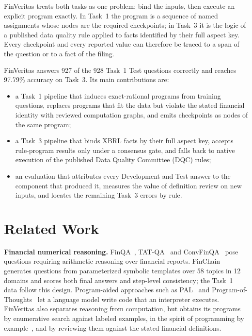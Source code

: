 \documentclass[conference]{IEEEtran}
\begin{document}
FinVeritas treats both tasks as one problem: bind the inputs, then execute an explicit program exactly. In Task~1 the program is a sequence of named assignments whose nodes are the required checkpoints; in Task~3 it is the logic of a published data quality rule applied to facts identified by their full aspect key. Every checkpoint and every reported value can therefore be traced to a span of the question or to a fact of the filing.

FinVeritas answers 927 of the 928 Task~1 Test questions correctly and reaches 97.79\% accuracy on Task~3. Its main contributions are:
\begin{itemize}
\item a Task~1 pipeline that induces exact-rational programs from training questions, replaces programs that fit the data but violate the stated financial identity with reviewed computation graphs, and emits checkpoints as nodes of the same program;
\item a Task~3 pipeline that binds XBRL facts by their full aspect key, accepts rule-program results only under a consensus gate, and falls back to native execution of the published Data Quality Committee (DQC) rules;
\item an evaluation that attributes every Development and Test answer to the component that produced it, measures the value of definition review on new inputs, and locates the remaining Task~3 errors by rule.
\end{itemize}

\section{Related Work}
\textbf{Financial numerical reasoning.} FinQA~\cite{chen2021finqa}, TAT-QA~\cite{zhu2021tatqa} and ConvFinQA~\cite{chen2022convfinqa} pose questions requiring arithmetic reasoning over financial reports. FinChain~\cite{xie-etal-2026-finchain} generates questions from parameterized symbolic templates over 58 topics in 12 domains and scores both final answers and step-level consistency; the Task~1 data follow this design. Program-aided approaches such as PAL~\cite{gao2023pal} and Program-of-Thoughts~\cite{chen2023pot} let a language model write code that an interpreter executes. FinVeritas also separates reasoning from computation, but obtains its programs by enumerative search against labeled examples, in the spirit of programming by example~\cite{gulwani2011flashfill}, and by reviewing them against the stated financial definitions.
\end{document}

